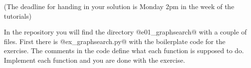 

\renewcommand{\course}{Artificial Intelligence}
\renewcommand{\coursepicture}{course_ai}
\renewcommand{\coursedate}{Winter 2019}
\renewcommand{\exnum}{Exercise 1}

\exercises
{}
\exercisestitle










(The deadline for handing in your solution is Monday 2pm in the week of the tutorials)

In the repository you will find the directory @e01_graphsearch@ with a
couple of files. First there is @ex_graphsearch.py@ with the
boilerplate code for the exercise. The comments in the code define
what each function is supposed to do. Implement each function and you
are done with the exercise.

